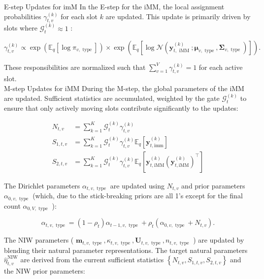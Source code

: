 \documentclass[10pt]{article}
\begin{document}
E-step Updates for imM In the E-step for the iMM, the local assignment probabilities $\gamma_{t, v}^{(k)}$ for each slot $k$ are updated. This update is primarily driven by slots where $\mathcal{G}_{t}^{(k)} \approx 1$ :


\begin{equation*}
\gamma_{t, v}^{(k)} \propto \exp \left(\mathbb{E}_{q}\left[\log \pi_{v, \text { type }}\right]\right) \times \exp \left(\mathbb{E}_{q}\left[\log \mathcal{N}\left(\mathbf{y}_{t, \text { iMM }}^{(k)} ; \boldsymbol{\mu}_{v, \text { type }}, \boldsymbol{\Sigma}_{v, \text { type }}\right)\right]\right) . \tag{48}
\end{equation*}


These responsibilities are normalized such that $\sum_{v=1}^{V} \gamma_{t, v}^{(k)}=1$ for each active slot.\\
M-step Updates for iMM During the M-step, the global parameters of the iMM are updated. Sufficient statistics are accumulated, weighted by the gate $\mathcal{G}_{t}^{(k)}$ to ensure that only actively moving slots contribute significantly to the updates:


\begin{align*}
N_{t, v} & =\sum_{k=1}^{K} \mathcal{G}_{t}^{(k)} \gamma_{t, v}^{(k)} \\
S_{1, t, v} & =\sum_{k=1}^{K} \mathcal{G}_{t}^{(k)} \gamma_{t, v}^{(k)} \mathbb{E}_{q}\left[\mathbf{y}_{t, \mathrm{imm}}^{(k)}\right]  \tag{49}\\
S_{2, t, v} & =\sum_{k=1}^{K} \mathcal{G}_{t}^{(k)} \gamma_{t, v}^{(k)} \mathbb{E}_{q}\left[\mathbf{y}_{t, \mathrm{iMM}}^{(k)}\left(\mathbf{y}_{t, \mathrm{iMM}}^{(k)}\right)^{\top}\right]
\end{align*}


The Dirichlet parameters $\alpha_{t, v, \text { type }}$ are updated using $N_{t, v}$ and prior parameters $\alpha_{0, v, \text { type }}$ (which, due to the stick-breaking priors are all 1's except for the final count $\alpha_{0, V, \text { type }}$ ):


\begin{equation*}
\alpha_{t, v, \text { type }}=\left(1-\rho_{t}\right) \alpha_{t-1, v, \text { type }}+\rho_{t}\left(\alpha_{0, v, \text { type }}+N_{t, v}\right) . \tag{50}
\end{equation*}


The NIW parameters ( $\mathbf{m}_{t, v, \text { type }}, \kappa_{t, v, \text { type }}, \mathbf{U}_{t, v, \text { type }}, n_{t, v, \text { type }}$ ) are updated by blending their natural parameter representations. The target natural parameters $\widehat{\eta}_{t, v}^{\mathrm{NIW}}$ are derived from the current sufficient statistics $\left\{N_{t, v}, S_{1, t, v}, S_{2, t, v}\right\}$ and the NIW prior parameters:
\end{document}
